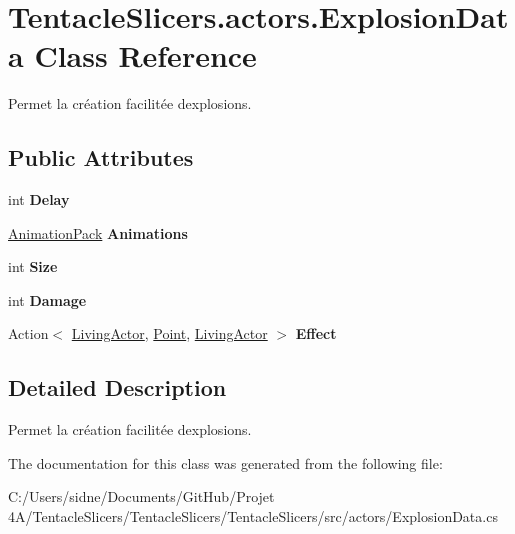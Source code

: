 \hypertarget{class_tentacle_slicers_1_1actors_1_1_explosion_data}{}\section{Tentacle\+Slicers.\+actors.\+Explosion\+Data Class Reference}
\label{class_tentacle_slicers_1_1actors_1_1_explosion_data}


Permet la création facilitée d\textquotesingle{}explosions.  


\subsection*{Public Attributes}
\begin{DoxyCompactItemize}
\item 
\mbox{\label{class_tentacle_slicers_1_1actors_1_1_explosion_data_aa28a28c8d9e6b0565eaa4ed6422c8e2e}} 
int {\bfseries Delay}
\item 
\mbox{\label{class_tentacle_slicers_1_1actors_1_1_explosion_data_ae1e2db296d7e71e082f0f25f7989991d}} 
\hyperlink{class_tentacle_slicers_1_1graphics_1_1_animation_pack}{Animation\+Pack} {\bfseries Animations}
\item 
\mbox{\label{class_tentacle_slicers_1_1actors_1_1_explosion_data_ab1e32cf831af189dae3f3ba58ea175c6}} 
int {\bfseries Size}
\item 
\mbox{\label{class_tentacle_slicers_1_1actors_1_1_explosion_data_a382a8af830a5a5173d7bf8921464c433}} 
int {\bfseries Damage}
\item 
\mbox{\label{class_tentacle_slicers_1_1actors_1_1_explosion_data_a3700afd2d0711506c8c067bfd67e3158}} 
Action$<$ \hyperlink{class_tentacle_slicers_1_1actors_1_1_living_actor}{Living\+Actor}, \hyperlink{class_tentacle_slicers_1_1general_1_1_point}{Point}, \hyperlink{class_tentacle_slicers_1_1actors_1_1_living_actor}{Living\+Actor} $>$ {\bfseries Effect}
\end{DoxyCompactItemize}


\subsection{Detailed Description}
Permet la création facilitée d\textquotesingle{}explosions. 



The documentation for this class was generated from the following file\+:\begin{DoxyCompactItemize}
\item 
C\+:/\+Users/sidne/\+Documents/\+Git\+Hub/\+Projet 4\+A/\+Tentacle\+Slicers/\+Tentacle\+Slicers/\+Tentacle\+Slicers/src/actors/Explosion\+Data.\+cs\end{DoxyCompactItemize}
